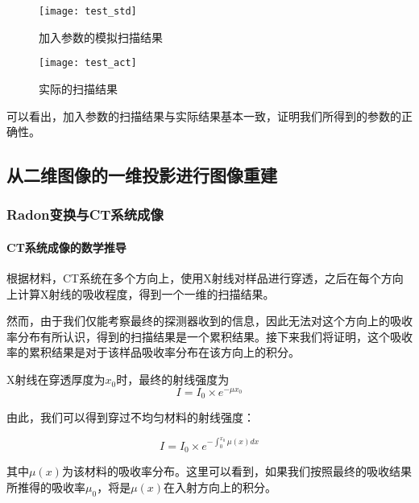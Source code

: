 \documentclass[withoutpreface,bwprint]{cumcmthesis} %
\begin{document}
      \begin{figure}[!htbp]
        \begin{minipage}[t]{0.5\linewidth}
          \centering
          \texttt{[image: test\_std]}
          \caption{加入参数的模拟扫描结果}
          \label{test_std}
        \end{minipage}
        \begin{minipage}[t]{0.5\linewidth}
          \centering
          \texttt{[image: test\_act]}
          \caption{实际的扫描结果}
          \label{test_act}
        \end{minipage}
      \end{figure}

      可以看出，加入参数的扫描结果与实际结果基本一致，证明我们所得到的参数的正确性。

  \subsection{从二维图像的一维投影进行图像重建}

    \subsubsection{Radon变换与CT系统成像}

      \paragraph{CT系统成像的数学推导}

        根据材料，CT系统在多个方向上，使用X射线对样品进行穿透，之后在每个方向上计算X射线的吸收程度，得到一个一维的扫描结果。

        然而，由于我们仅能考察最终的探测器收到的信息，因此无法对这个方向上的吸收率分布有所认识，得到的扫描结果是一个累积结果。接下来我们将证明，这个吸收率的累积结果是对于该样品吸收率分布在该方向上的积分。

        X射线在穿透厚度为$x_0$时，最终的射线强度为
        \begin{equation}
          I = I_0 \times e^{-\mu x_0}
        \end{equation}

        由此，我们可以得到穿过不均匀材料的射线强度：

        \begin{equation}
          I = I_0 \times e^{-\int_0^{x_0}{\mu(x)dx}}
        \end{equation}

        其中$\mu(x)$为该材料的吸收率分布。这里可以看到，如果我们按照最终的吸收结果所推得的吸收率$\mu_{0}$，将是$\mu(x)$在入射方向上的积分。
\end{document}
